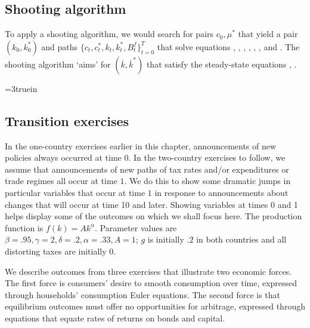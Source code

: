 \subsection{Shooting algorithm}

To apply a shooting algorithm, we would search for pairs $c_0, \mu^*$ that yield a pair $(k_0, k_0^*)$ and paths  $\{c_t, c_t^*, k_t, k_t^*, B_t^f\}_{t=0}^T$ that solve equations
, , , , ,
, and .  The shooting algorithm  `aims' for   $(\overline k, \overline k^*)$ that satisfy the steady-state
equations , .




\centerline{\epsfxsize=3truein}
\caption{Response to unforeseen opening of trade at time $1$.
From left to right, top to bottom: $k, c, \bar R, \eta, x,$ and $B^f$. The solid line is the domestic country, the dashed line is the foreign
country and the dashed dotted line is the original
steady state.}
\endfigure
\subsection{Transition exercises}

 In the one-country exercises  earlier in this chapter, announcements of new policies always occurred at time $0$.
In the two-country exercises to follow, we assume that announcements of new paths of tax rates and/or expenditures or trade
regimes all occur at time $1$.  We do this to show some dramatic jumps in  particular variables that occur at
time $1$ in response to announcements about changes that will occur at time 10 and later.  Showing variables at times 0 and
1 helps display some of the outcomes on which we shall  focus here.
The production function is $f(k) = A k^\alpha$. Parameter values are $\beta=.95, \gamma =2, \delta = .2, \alpha = .33, A=1$;
 $g$ is initially
$.2$  in both countries and all distorting taxes are initially $0$.

 We describe outcomes from three exercises that illustrate  two
economic forces. The first force  is consumers' desire to smooth
consumption over time, expressed through  households' consumption Euler equations.
The second  force is that equilibrium outcomes must offer no opportunities for arbitrage, expressed through  equations that
equate rates of returns on bonds and capital.

